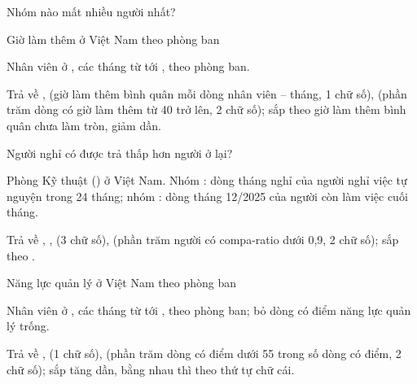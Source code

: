 \documentclass[11pt,a4paper]{article}
\begin{document}
\begin{cauhoi}[ma=hr-c8-diem-nong-vn-engineering, dulieu=hr, domain=after_sales,
  hinhthuc=case, cap=hard, diem=50, tacgia={Agent gói 4}, trangthai=review, bokiemtra={public, hidden-1}, thutu=co, saiso=0.01]
\begin{buoc}[ma=b1, diem=10, hinhthuc=write, bang={employee_monthly_snapshot}]{Nhóm nào mất nhiều người nhất?}
\begin{yeucau}
  \end{yeucau}
\end{buoc}
\begin{buoc}[ma=b2, diem=10, hinhthuc=write, bang={employee_monthly_snapshot}]{Giờ làm thêm ở Việt Nam theo phòng ban}
  \begin{yeucau}
    \item Nhân viên ở , các tháng từ  tới , theo phòng ban.
    \item Trả về ,  (giờ làm thêm bình quân mỗi dòng nhân viên – tháng, 1 chữ số),  (phần trăm dòng có giờ làm thêm từ 40 trở lên, 2 chữ số); sắp theo giờ làm thêm bình quân chưa làm tròn, giảm dần.
  \end{yeucau}
\end{buoc}
\begin{buoc}[ma=b3, diem=10, hinhthuc=write, bang={employee_monthly_snapshot}]{Người nghỉ có được trả thấp hơn người ở lại?}
  \begin{yeucau}
    \item Phòng Kỹ thuật () ở Việt Nam. Nhóm : dòng tháng nghỉ của người nghỉ việc tự nguyện trong 24 tháng; nhóm : dòng tháng 12/2025 của người còn làm việc cuối tháng.
    \item Trả về , ,  (3 chữ số),  (phần trăm người có compa-ratio dưới 0,9, 2 chữ số); sắp theo .
  \end{yeucau}
\end{buoc}
\begin{buoc}[ma=b4, diem=10, hinhthuc=write, bang={employee_monthly_snapshot}]{Năng lực quản lý ở Việt Nam theo phòng ban}
  \begin{yeucau}
    \item Nhân viên ở , các tháng từ  tới , theo phòng ban; bỏ dòng có điểm năng lực quản lý trống.
    \item Trả về ,  (1 chữ số),  (phần trăm dòng có điểm dưới 55 trong số dòng có điểm, 2 chữ số); sắp  tăng dần, bằng nhau thì  theo thứ tự chữ cái.
  \end{yeucau}

\end{buoc}
\end{cauhoi}
\end{document}
